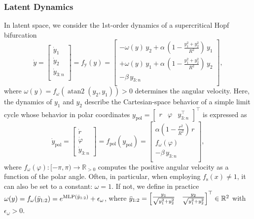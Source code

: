 \subsubsection{Latent Dynamics}
In latent space, we consider the 1st-order dynamics of a supercritical Hopf bifurcation~\citep{strogatz2018nonlinear, khadivar2021learning, zhi2024teaching, nah2025combining}
\begin{equation}\label{eq:osmp:latent_dynamics}
    \dot{y} = \begin{bmatrix}
        \dot{y}_1\\
        \dot{y}_2\\
        \dot{y}_{3:n}\\
    \end{bmatrix} = f_\mathrm{y}(y) = \begin{bmatrix}
        -\omega(y) \, y_2 + \alpha \, \left ( 1 - \frac{y_1^2 + y_2^2}{R^2} \right ) \, y_1\\
        + \omega(y) \, y_1 + \alpha \, \left ( 1 - \frac{y_1^2 + y_2^2}{R^2} \right ) \, y_2\\
        -\beta \, y_{3:n}\\
    \end{bmatrix},
\end{equation}
where $\omega(y) = f_\omega(\operatorname{atan2}(y_2, y_1)) > 0$ determines the angular velocity.
Here, the dynamics of $y_1$ and $y_2$ describe the Cartesian-space behavior of a simple limit cycle whose behavior in polar coordinates $y_\mathrm{pol} = \begin{bmatrix}
    r & \varphi & y_{3:n}^\top
\end{bmatrix}^\top$ is expressed as
\begin{equation}\label{eq:osmp:latent_dynamics_polar_coordinates}
    \dot{y}_\mathrm{pol} = \begin{bmatrix}
        \dot{r}\\ \dot{\varphi}\\ \dot{y}_{3:n}
    \end{bmatrix} = f_\mathrm{pol}(y_\mathrm{pol}) = \begin{bmatrix}
        \alpha \left ( 1 - \frac{r^2}{R^2} \right ) \, r\\ f_\omega(\varphi)\\ -\beta \, y_{3:n}\\
    \end{bmatrix},
\end{equation}
where $f_\omega(\varphi): [-\pi, \pi) \to \mathbb{R}_{>0}$ computes the positive angular velocity as a function of the polar angle. Often, in particular, when employing $f_\mathrm{s}(x) \neq 1$, it can also be set to a constant: $\omega = 1$. 
If not, we define in practice $\omega(y) = f_\omega(\Bar{y}_{1:2}) = e^{\mathrm{MLP}(\Bar{y}_{1:2})} + \epsilon_\omega$, where $\Bar{y}_{1:2} = \begin{bmatrix}
    \frac{y_1}{\sqrt{y_1^2+y_2^2}} &  \frac{y_2}{\sqrt{y_1^2+y_2^2}}
\end{bmatrix}^\top \in \mathbb{R}^2$ with $\epsilon_\omega > 0$.

